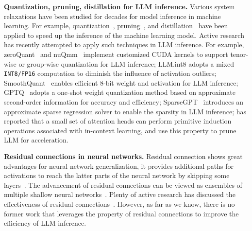 \noindent \textbf{Quantization, pruning, distillation for LLM inference.} Various system relaxations have been studied for decades for model inference in machine learning. For example, quantization~\cite{han2015deep, jacob2018quantization,nagel2019data,zhao2019improving}, pruning~\cite{molchanov2016pruning,liu2018rethinking,he2019filter,hoefler2021sparsity}, and distillation~\cite{hinton2015distilling,cho2019efficacy,tang2019distilling,touvron2021training}  have been applied to speed up the inference of the machine learning model. Active research has recently attempted to apply such techniques in LLM inference. For example, zeroQuant~\cite{yao2022zeroquant} and nuQmm~\cite{park2022nuqmm} implement customized CUDA kernels to support tenor-wise or group-wise quantization for LLM inference; LLM.int8 \cite{dettmers2022llm} adopts a mixed \texttt{INT8/FP16} computation to diminish the influence of activation outliers; SmoothQuant~\cite{xiao2022smoothquant} enables efficient 8-bit weight and activation for LLM inference; GPTQ~\cite{frantar2022gptq} adopts a one-shot weight quantization method based on approximate second-order information for accuracy and efficiency; SparseGPT~\cite{frantar2023massive} introduces an approximate sparse regression solver to enable the sparsity in LLM inference; \cite{bansal2022rethinking} has reported that a small set of attention heads can perform primitive induction operations associated with in-context learning, and use this property to prune LLM for acceleration. 






\noindent \textbf{Residual connections in neural networks.} Residual connection shows great advantages for neural network generalization, it provides additional paths for activations to reach the latter parts of the neural network by skipping some layers~\cite{he2016deep}. The advancement of residual connections can be viewed as ensembles of multiple shallow neural networks~\cite{veit2016residual}. Plenty of active research has discussed the effectiveness of residual connections~\cite{balduzzi2017shattered,bello2021revisiting,allen2019can,frei2019algorithm}. However, as far as we know, there is no former work that leverages the property of residual connections to improve the efficiency of LLM inference.  


